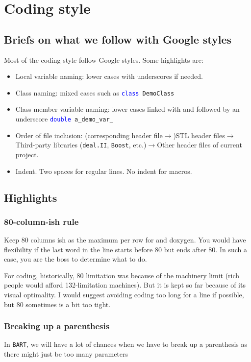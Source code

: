 \documentclass[openany]{book}
\newcommand{\bart}{{\tt BART}}
\newcommand{\blue}[1]{\textcolor{blue}{#1}}
\begin{document}
\chapter{Coding style}\label{ch:style-guide}
\section{Briefs on what we follow with Google styles}
Most of the coding style follow Google styles. Some highlights are:
\begin{itemize}
	\item Local variable naming: lower cases with underscores if needed.
	\item Class naming: mixed cases such as {\tt \blue{class} DemoClass}
	\item Class member variable naming: lower cases linked with and followed by an underscore {\tt \blue{double} a\_demo\_var\_}
	\item Order of file inclusion: (corresponding header file$\rightarrow$)STL header files$\rightarrow$Third-party libraries ({\tt deal.II}, {\tt Boost}, etc.)$\rightarrow$Other header files of current project.
	\item Indent. Two spaces for regular lines. No indent for macros.
\end{itemize}
\section{Highlights}
\subsection{80-column-ish rule}
Keep 80 columns ish as the maximum per row for and doxygen. You would have flexibility if the last word in the line starts before 80 but ends after 80. In such a case, you are the boss to determine what to do.

For coding, historically, 80 limitation was because of the machinery limit (rich people would afford 132-limitation machines). But it is kept so far because of its visual optimality. I would suggest avoiding coding too long for a line if possible, but 80 sometimes is a bit too tight.

\subsection{Breaking up a parenthesis}
In \bart, we will have a lot of chances when we have to break up a parenthesis as there might just be too many parameters
\end{document}
